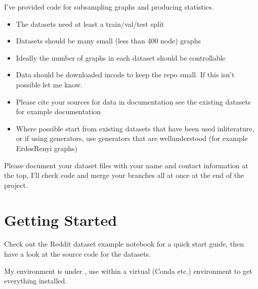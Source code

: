\documentclass[letterpaper,10pt,english]{sphinxhowto}
\begin{document}
\sphinxAtStartPar
I’ve provided code for sub\sphinxhyphen{}sampling graphs and producing statistics.
\begin{description}
\begin{itemize}
\item {} 
\sphinxAtStartPar
The datasets need at least a train/val/test split

\item {} 
\sphinxAtStartPar
Datasets should be many small (less than 400 node) graphs

\item {} 
\sphinxAtStartPar
Ideally the number of graphs in each dataset should be controllable

\item {} 
\sphinxAtStartPar
Data should be downloaded in\sphinxhyphen{}code to keep the repo small. If this isn’t possible let me know.

\item {} 
\sphinxAtStartPar
Please cite your sources for data in documentation \sphinxhyphen{} see the existing datasets for example documentation

\item {} 
\sphinxAtStartPar
Where possible start from existing datasets that have been used in\sphinxhyphen{}literature, or if using generators, use generators that are well\sphinxhyphen{}understood (for example Erdos\sphinxhyphen{}Renyi graphs)

\end{itemize}

\end{description}

\sphinxAtStartPar
Please document your dataset files with your name and contact information at the top, I’ll check code and merge your branches all at once at the end of the project.


\section{Getting Started}
\label{\detokenize{index:getting-started}}
\sphinxAtStartPar
Check out the Reddit dataset example notebook for a quick start guide, then have a look at the source code for the datasets.

\sphinxAtStartPar
My environment is under , use  within a virtual (Conda etc.) environment to get everything installed.
\end{document}
